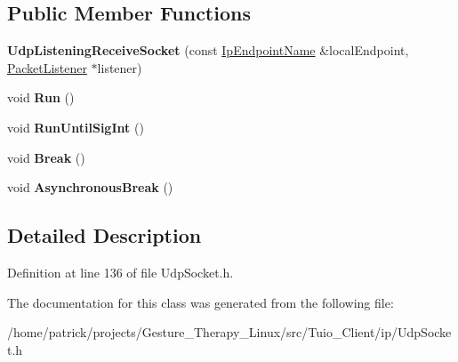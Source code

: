 \subsection*{Public Member Functions}
\begin{DoxyCompactItemize}
\item 
\mbox{\label{class_udp_listening_receive_socket_af5af192af5613b66f8971bd3cf0738e2}} 
{\bfseries Udp\+Listening\+Receive\+Socket} (const \hyperlink{class_ip_endpoint_name}{Ip\+Endpoint\+Name} \&local\+Endpoint, \hyperlink{class_packet_listener}{Packet\+Listener} $\ast$listener)
\item 
\mbox{\label{class_udp_listening_receive_socket_a50f7b0dd36f21164d6de793d20fd11df}} 
void {\bfseries Run} ()
\item 
\mbox{\label{class_udp_listening_receive_socket_a0bf0b7cbdfc99425158502a997223959}} 
void {\bfseries Run\+Until\+Sig\+Int} ()
\item 
\mbox{\label{class_udp_listening_receive_socket_ad165f78892e27603663a2226472304a8}} 
void {\bfseries Break} ()
\item 
\mbox{\label{class_udp_listening_receive_socket_a9b032cbb726ed87c492b9829bdca7a34}} 
void {\bfseries Asynchronous\+Break} ()
\end{DoxyCompactItemize}


\subsection{Detailed Description}


Definition at line 136 of file Udp\+Socket.\+h.



The documentation for this class was generated from the following file\+:\begin{DoxyCompactItemize}
\item 
/home/patrick/projects/\+Gesture\+\_\+\+Therapy\+\_\+\+Linux/src/\+Tuio\+\_\+\+Client/ip/Udp\+Socket.\+h\end{DoxyCompactItemize}
